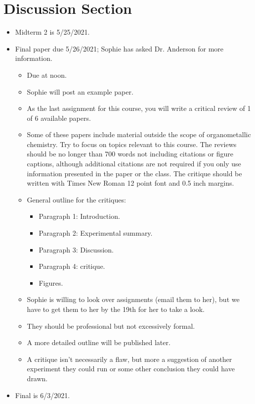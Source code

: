 \documentclass[../notes.tex]{subfiles}
\begin{document}
\section{Discussion Section}
\begin{itemize}
    \item {}Midterm 2 is 5/25/2021.
    \item Final paper due 5/26/2021; Sophie has asked Dr. Anderson for more information.
    \begin{itemize}
        \item Due at noon.
        \item Sophie will post an example paper.
        \item As the last assignment for this course, you will write a critical review of 1 of 6 available papers.
        \item Some of these papers include material outside the scope of organometallic chemistry. Try to focus on topics relevant to this course. The reviews should be no longer than 700 words not including citations or figure captions, although additional citations are not required if you only use information presented in the paper or the class. The critique should be written with Times New Roman 12 point font and 0.5 inch margins.
        \item General outline for the critiques:
        \begin{itemize}
            \item Paragraph 1: Introduction.
            \item Paragraph 2: Experimental summary.
            \item Paragraph 3: Discussion.
            \item Paragraph 4: critique.
            \item Figures.
        \end{itemize}
        \item Sophie is willing to look over assignments (email them to her), but we have to get them to her by the 19th for her to take a look.
        \item They should be professional but not excessively formal.
        \item A more detailed outline will be published later.
        \item A critique isn't necessarily a flaw, but more a suggestion of another experiment they could run or some other conclusion they could have drawn.
    \end{itemize}
    \item Final is 6/3/2021.

\end{itemize}
\end{document}
